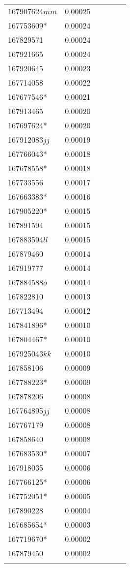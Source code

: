 \begin{landscape}
\begin{longtable}{p{1.6cm}p{1.2cm}p{1.5cm}p{1.5cm}p{2.8cm}p{13.5cm}}
167907624$mm$&0.00025&&&& \\
167753609*&0.00024&&&& \\
167829571&0.00024&&&& \\
167921665&0.00024&&&& \\
167920645&0.00023&&&& \\
167714058&0.00022&&&& \\
167677546*&0.00021&&&& \\
167913465&0.00020&&&& \\
167697624*&0.00020&&&& \\
167912083$jj$&0.00019&&&& \\
167766043*&0.00018&&&& \\
167678558*&0.00018&&&& \\
167733556&0.00017&&&& \\
167663383*&0.00016&&&& \\
167905220*&0.00015&&&& \\
167891594&0.00015&&&& \\
167883594$ll$&0.00015&&&& \\
167879460&0.00014&&&& \\
167919777&0.00014&&&& \\
167884588$o$&0.00014&&&& \\
167822810&0.00013&&&& \\
167713494&0.00012&&&& \\
167841896*&0.00010&&&& \\
167804467*&0.00010&&&& \\
167925043$kk$&0.00010&&&& \\
167858106&0.00009&&&& \\
167788223*&0.00009&&&& \\
167878206&0.00008&&&& \\
167764895$jj$&0.00008&&&& \\
167767179&0.00008&&&& \\
167858640&0.00008&&&& \\
167683530*&0.00007&&&& \\
167918035&0.00006&&&& \\
167766125*&0.00006&&&& \\
167752051*&0.00005&&&& \\
167890228&0.00004&&&& \\
167685654*&0.00003&&&& \\
167719670*&0.00002&&&& \\
167879450&0.00002&&&& \\
&&&&& \\

\end{longtable}
\end{landscape}
